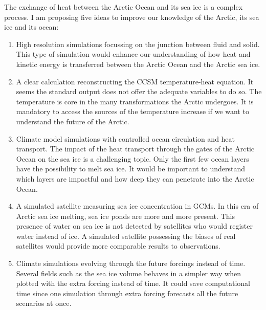 The exchange of heat between the Arctic Ocean and its sea ice is a complex process. I am proposing five ideas to improve our knowledge of the Arctic, its sea ice and its ocean:
\begin{enumerate}
\item High resolution simulations focussing on the junction between fluid and solid. This type of simulation would enhance our understanding of how heat and kinetic energy is transferred between the Arctic Ocean and the Arctic sea ice. 
\item A clear calculation reconstructing the CCSM temperature-heat equation. It seems the standard output does not offer the adequate variables to do so. The temperature is core in the many transformations the Arctic undergoes. It is mandatory to access the sources of the temperature increase if we want to understand the future of the Arctic. 
\item Climate model simulations with controlled ocean circulation and heat transport. The impact of the heat transport through the gates of the Arctic Ocean on the sea ice is a challenging topic. Only the first few ocean layers have the possibility to melt sea ice. It would be important to understand which layers are impactful and how deep they can penetrate into the Arctic Ocean. 
\item A simulated satellite measuring sea ice concentration in GCMs. In this era of Arctic sea ice melting, sea ice ponds are more and more present. This presence of water on sea ice is not detected by satellites who would register water instead of ice. A simulated satellite possessing the biases of real satellites would provide more comparable results to observations.
\item Climate simulations evolving through the future forcings instead of time. Several fields such as the sea ice volume behaves in a simpler way when plotted with the extra forcing instead of time. It could save computational time since one simulation through extra forcing forecasts all the future scenarios at once.
\end{enumerate}










